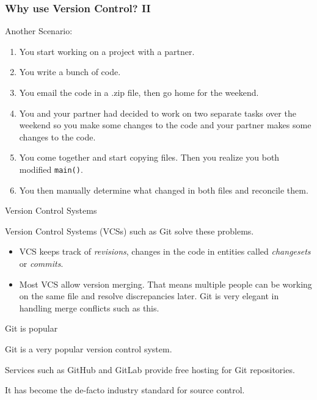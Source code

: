 \documentclass{beeper}
\begin{document}
\begin{frame}
    \frametitle{Why use Version Control? II}

    Another Scenario:

    \begin{enumerate}[<+->]
        \item You start working on a project with a partner.
        \item You write a bunch of code.
        \item You email the code in a .zip file, then go home for the weekend.
        \item You and your partner had decided to work on two separate tasks
            over the weekend so you make some changes to the code and your
            partner makes some changes to the code.
        \item You come together and start copying files. Then you realize you
            both modified \texttt{main()}.
        \item You then manually determine what changed in both files and
            reconcile them.
    \end{enumerate}

\end{frame}

\begin{frame}{Version Control Systems}

    Version Control Systems (VCSs) such as Git solve these problems.

    \begin{itemize}[<+->]
        \item VCS keeps track of \textit{revisions}, changes in the code in
            entities called \textit{changesets} or \textit{commits}.
        \item Most VCS allow version merging. That means multiple people can be
            working on the same file and resolve discrepancies later. Git is
            very elegant in handling merge conflicts such as this.
    \end{itemize}
\end{frame}

\begin{frame}{Git is popular}

    Git is a very popular version control system.

    Services such as GitHub and GitLab provide free hosting for Git
    repositories.

    It has become the de-facto industry standard for source control.

\end{frame}
\end{document}
